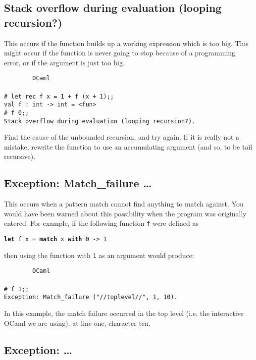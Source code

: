 \documentclass[]{book}
\newcommand{\smspace}{\vspace{4mm}}
\begin{document}
\subsection*{Stack overflow during evaluation (looping recursion?)}

This occurs if the function builds up a working expression which is too big. This might occur if the function is never going to stop because of a programming error, or if the argument is just too big.

\smspace
\noindent\verb!        OCaml!\\
\noindent\\
\texttt{\# let rec f x = 1 + f (x + 1);;}\\
\texttt{val f :\ int -> int = <fun>}\\
\texttt{\# f 0;;}\\
\texttt{Stack overflow during evaluation (looping recursion?).}
\smspace

\noindent Find the cause of the unbounded recursion, and try again. If it is really not a mistake, rewrite the function to use an accumulating argument (and so, to be tail recursive).

\subsection*{Exception: Match\_failure \ldots}

This occurs when a pattern match cannot find anything to match against. You would have been warned about this possibility when the program was originally entered. For example, if the following function \texttt{f} were defined as 

\smspace
\texttt{\textbf{let} f x = \textbf{match} x \textbf{with} 0 -> 1}
\smspace

\noindent then using the function with \texttt{1} as an argument would produce:

\smspace
\noindent\verb!        OCaml!\\
\noindent\\
\texttt{\# f 1;;}\\
\texttt{Exception:\ Match\_failure ("//toplevel//", 1, 10).}
\smspace

\noindent In this example, the match failure occurred in the top level (i.e. the interactive OCaml we are using), at line one, character ten.

\subsection*{Exception: \ldots}
\end{document}
